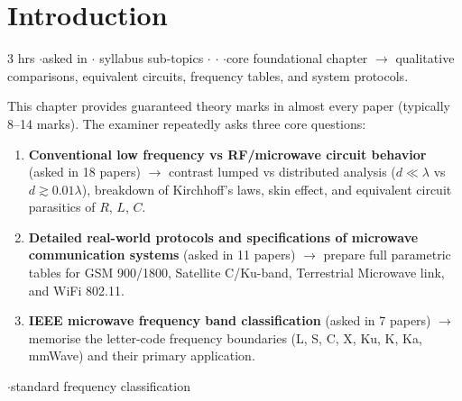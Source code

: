 \section{Introduction}
{\color{sub}\footnotesize 3 hrs \gap$\cdot$\gap asked in 
\gap$\cdot$ syllabus sub-topics \gap$\cdot$\gap {} \gap$\cdot$\gap {} \gap$\cdot$\gap core foundational chapter
$\rightarrow$ qualitative comparisons, equivalent circuits, frequency tables, and system protocols.}

\vspace{3pt}\noindent
\colorbox{gdL}{\makebox[\dimexpr\textwidth-2\fboxsep][l]{%
  \textcolor{gd}{\bfseries\footnotesize READ THIS FIRST}}}
\par\nobreak\vspace{3pt}

This chapter provides guaranteed theory marks in almost every paper (typically 8--14 marks).
The examiner repeatedly asks three core questions:
\begin{enumerate}[label=\arabic*., leftmargin=1.4em, itemsep=1pt]
  \item \textbf{Conventional low frequency vs RF/microwave circuit behavior} (asked in 18 papers) $\rightarrow$ contrast lumped vs distributed analysis ($d \ll \lambda$ vs $d \gtrsim 0.01\lambda$), breakdown of Kirchhoff's laws, skin effect, and equivalent circuit parasitics of $R$, $L$, $C$.
  \item \textbf{Detailed real-world protocols and specifications of microwave communication systems} (asked in 11 papers) $\rightarrow$ prepare full parametric tables for GSM 900/1800, Satellite C/Ku-band, Terrestrial Microwave link, and WiFi 802.11.
  \item \textbf{IEEE microwave frequency band classification} (asked in 7 papers) $\rightarrow$ memorise the letter-code frequency boundaries (L, S, C, X, Ku, K, Ka, mmWave) and their primary application.
\end{enumerate}

\hr


{\color{sub}\footnotesize {}  \gap$\cdot$\gap standard frequency classification}

